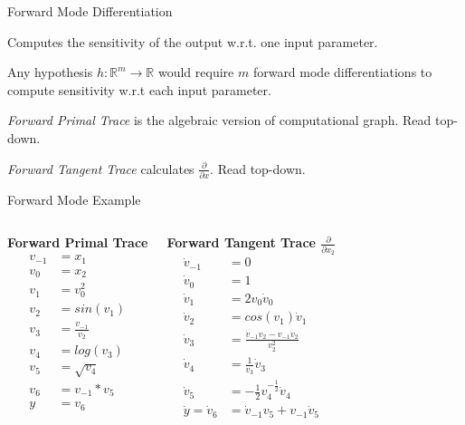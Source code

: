 \documentclass{beamer}
\begin{document}
\begin{frame}{Forward Mode Differentiation}

Computes the sensitivity of the output w.r.t. one input parameter.

Any hypothesis $h: \mathbb{R}^m \to \mathbb{R}$ would require $m$ forward mode
differentiations to compute sensitivity w.r.t each input parameter.

\textit{Forward Primal Trace} is the algebraic version of computational graph. Read
top-down.

\textit{Forward Tangent Trace} calculates $\frac{\partial}{\partial x }$. Read top-down.

\end{frame}

\begin{frame}{Forward Mode Example}
\begin{columns}[T,onlytextwidth]
      \textbf{Forward Primal Trace}
      \begin{align*}
		v_{-1} &= x_1 \\
		v_0 &= x_2 \\
		v_1 &= v_0^2 \\
		v_2 &= sin(v_1) \\
		v_3 &= \frac{v_{-1}}{v_2} \\
		v_4 &= log(v_3) \\
		v_5 &= \sqrt{v_4} \\
		v_6 &= v_{-1} * v_5 \\
		y &= v_6
      \end{align*}

      \textbf{Forward Tangent Trace $\frac{\partial}{\partial x_2 }$}
	  \begin{align*}
		\dot{v}_{-1} &= 0 \\
		\dot{v}_0 &= 1 \\
		\dot{v}_1 &= 2v_0\dot{v}_0 \\
		\dot{v}_2 &= cos(v_1)\dot{v}_1 \\
		\dot{v}_3 &= \frac{\dot{v}_{-1}v_2 - v_{-1}\dot{v}_2}{v_2^2} \\
		\dot{v}_4 &= \frac{1}{v_3}\dot{v}_3 \\
		\dot{v}_5 &= -\frac{1}{2}v_4^{-\frac{1}{2}}\dot{v}_4 \\
		\dot{y} = \dot{v}_6 &= \dot{v}_{-1} v_5 + v_{-1}\dot{v}_5
	  \end{align*}
\end{columns}
\end{frame}
\end{document}
